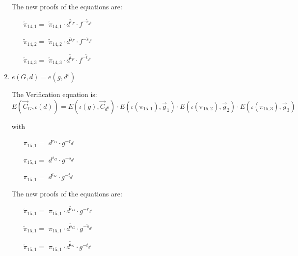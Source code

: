 \begin{description}
\begin{enumerate}
    The new proofs of the equations are:
    \begin{itemize}
    \item[$\tilde{\pi}_{14,1} = $] $\tilde{\pi}_{14,1} \cdot d^{\tilde{r}_F} \cdot f^{-\tilde{r}_{d^b}}$    
    \item[$\tilde{\pi}_{14,2} = $] $\tilde{\pi}_{14,2} \cdot d^{\tilde{s}_F} \cdot f^{-\tilde{s}_{d^b}}$    
    \item[$\tilde{\pi}_{14,3} = $] $\tilde{\pi}_{14,3} \cdot d^{\tilde{t}_F} \cdot f^{-\tilde{t}_{d^b}}$
    \end{itemize}


  \item \label{relationgd}
    $e(\boxed{G},d) = e(g, \boxed{d^b})$

    The Verification equation is: $E(\vec{C}_G, \iota(d)) = E(\iota(g), \vec{C}_{d^b}) \cdot E(\iota(\pi_{15,1}), \vec{g}_1)\cdot E(\iota(\pi_{15,2}), \vec{g}_2)\cdot E(\iota(\pi_{15,3}), \vec{g}_3)$

    with

    \begin{itemize}
    \item[$\pi_{15,1} = $] $d^{r_G} \cdot g^{-r_{d^b}}$    
    \item[$\pi_{15,1} = $] $d^{s_G} \cdot g^{-s_{d^b}}$    
    \item[$\pi_{15,1} = $] $d^{t_G} \cdot g^{-t_{d^b}}$
    \end{itemize}

    The new proofs of the equations are:
    
    \begin{itemize}
    \item[$\tilde{\pi}_{15,1} = $] $\pi_{15,1} \cdot d^{\tilde{r}_G} \cdot g^{-\tilde{r}_{d^b}}$    
    \item[$\tilde{\pi}_{15,1} = $] $\pi_{15,1} \cdot d^{\tilde{s}_G} \cdot g^{-\tilde{s}_{d^b}}$    
    \item[$\tilde{\pi}_{15,1} = $] $\pi_{15,1} \cdot d^{\tilde{t}_G} \cdot g^{-\tilde{t}_{d^b}}$
    \end{itemize}

    
  \end{enumerate}
\end{description}
